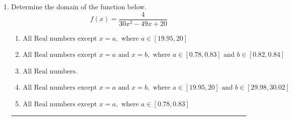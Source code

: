 \documentclass[14pt]{extbook}
\newcommand{\litem}[1]{\item#1\hspace*{-1cm}\rule{\textwidth}{0.4pt}}
\begin{document}
\begin{enumerate}
{\begin{enumerate}[label=\Alph*.]
\end{enumerate} }
\litem{
Determine the domain of the function below.\[ f(x) = \frac{4}{30x^{2} -49 x + 20} \]\begin{enumerate}[label=\Alph*.]
\item \( \text{All Real numbers except } x = a, \text{ where } a \in [19.95, 20] \)
\item \( \text{All Real numbers except } x = a \text{ and } x = b, \text{ where } a \in [0.78, 0.83] \text{ and } b \in [0.82, 0.84] \)
\item \( \text{All Real numbers.} \)
\item \( \text{All Real numbers except } x = a \text{ and } x = b, \text{ where } a \in [19.95, 20] \text{ and } b \in [29.98, 30.02] \)
\item \( \text{All Real numbers except } x = a, \text{ where } a \in [0.78, 0.83] \)

\end{enumerate} }
\end{enumerate}
\end{document}
